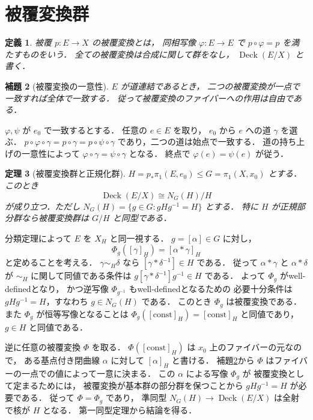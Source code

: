 \documentclass[a5paper,10pt,onecolumn]{jsarticle}
\makeatletter
\theoremstyle{mathnotetheorem}
\newtheorem{theorem}{定理}[section]
\newtheorem{definition}[theorem]{定義}
\newtheorem{lemma}[theorem]{補題}
\renewcommand{\proofname}{証明}
\renewenvironment{proof}[1][\proofname]{%
  \par\pushQED{\qed}\normalfont\topsep4\p@\@plus2\p@\relax
  \trivlist\item[\hskip\labelsep\bfseries #1]\ignorespaces
}{\popQED\endtrivlist\@endpefalse}
\makeatother
\begin{document}
\section{被覆変換群}

\begin{definition}
被覆 $p:E\to X$ の\emph{被覆変換}とは，
同相写像 $\varphi:E\to E$ で
$p\circ\varphi=p$ を満たすものをいう．
全ての被覆変換は合成に関して群をなし，
$\operatorname{Deck}(E/X)$ と書く．
\end{definition}

\begin{lemma}[被覆変換の一意性]\label{lem:deck-unique}
$E$ が道連結であるとき，
二つの被覆変換が一点で一致すれば全体で一致する．
従って被覆変換のファイバーへの作用は自由である．
\end{lemma}
\begin{proof}
$\varphi,\psi$ が $e_0$ で一致するとする．
任意の $e\in E$ を取り，
$e_0$ から $e$ への道 $\gamma$ を選ぶ．
$p\circ\varphi\circ\gamma
=p\circ\gamma
=p\circ\psi\circ\gamma$
であり，二つの道は始点で一致する．
道の持ち上げの一意性によって
$\varphi\circ\gamma=\psi\circ\gamma$ となる．
終点で $\varphi(e)=\psi(e)$ が従う．
\end{proof}

\begin{theorem}[被覆変換群と正規化群]\label{thm:deck-normalizer}
$H=p_*\pi_1(E,e_0)\le G=\pi_1(X,x_0)$ とする．
このとき
\[
 \operatorname{Deck}(E/X)\cong N_G(H)/H
\]
が成り立つ．ただし $N_G(H)=\{g\in G:gHg^{-1}=H\}$ とする．
特に $H$ が正規部分群なら被覆変換群は $G/H$ と同型である．
\end{theorem}
\begin{proof}
分類定理によって $E$ を $X_H$ と同一視する．
$g=[\alpha]\in G$ に対し，
\[
 \Phi_g([\gamma]_H)=[\alpha*\gamma]_H
\]
と定めることを考える．
$\gamma\sim_H\delta$ なら
$[\gamma*\delta^{-1}]\in H$ である．
従って $\alpha*\gamma$ と $\alpha*\delta$ が
$\sim_H$ に関して同値である条件は
$g[\gamma*\delta^{-1}]g^{-1}\in H$ である．
よって $\Phi_g$ がwell-definedとなり，
かつ逆写像 $\Phi_{g^{-1}}$ もwell-definedとなるための
必要十分条件は $gHg^{-1}=H$，すなわち $g\in N_G(H)$ である．
このとき $\Phi_g$ は被覆変換である．
また $\Phi_g$ が恒等写像となることは
$\Phi_g([\mathrm{const}]_H)=[\mathrm{const}]_H$ と同値であり，
$g\in H$ と同値である．

逆に任意の被覆変換 $\Phi$ を取る．
$\Phi([\mathrm{const}]_H)$ は $x_0$ 上のファイバーの元なので，
ある基点付き閉曲線 $\alpha$ に対して
$[\alpha]_H$ と書ける．
補題\ref{lem:deck-unique}から
$\Phi$ はファイバーの一点での値によって一意に決まる．
この $\alpha$ による写像 $\Phi_g$ が
被覆変換として定まるためには，
被覆変換が基本群の部分群を保つことから
$gHg^{-1}=H$ が必要である．
従って $\Phi=\Phi_g$ であり，
準同型 $N_G(H)\to\operatorname{Deck}(E/X)$ は全射で核が $H$ となる．
第一同型定理から結論を得る．
\end{proof}
\end{document}
